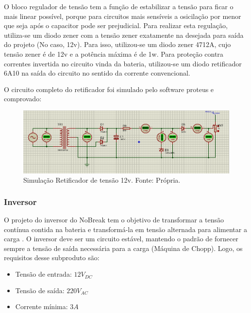             	O bloco regulador de tensão tem a função de estabilizar a tensão para ficar o 					mais linear possível, porque para circuitos mais sensíveis a osicilação por 					menor que seja após o capacitor  pode ser prejudicial. Para realizar esta 						regulação, utiliza-se um diodo zener com a tensão zener exatamente na desejada 				para saída do projeto (No caso, 12v).  Para isso, utilizou-se um diodo zener 					4712A, cujo tensão zener é de 12v e a potência máxima é de 1w. Para proteção 					contra correntes invertida no circuito vinda da bateria, utilizou-se um diodo 					retificador 6A10 na saída do circuito no sentido da corrente convencional.
		
				O circuito completo do retificador foi simulado pelo software proteus e 						comprovado:
				
                \begin{figure}[!htb]
            		\centering
            		\includegraphics[scale= 0.4]{figuras/Circuito_Retificador.png}
            		\caption{Simulação Retificador de tensão 12v. Fonte: Própria.}
            		\label{retificador-completo}
            	\end{figure}
 
             \subsubsection[Inversor]{Inversor}
				O projeto do inversor do NoBreak tem o objetivo de transformar a tensão 						contínua contida na bateria e transformá-la em tensão alternada para alimentar 				a carga . O inversor deve ser um circuito estável, mantendo o padrão de 						fornecer sempre a tensão de saída necessária para a carga (Máquina de Chopp). 					Logo, os requisitos desse subproduto são:
				
                \begin{itemize}
                	\item Tensão de entrada: $12V_{DC}$
                	\item Tensão de saída: $220V_{AC}$
                	\item Corrente mínima: $3A$
                \end{itemize}
                
